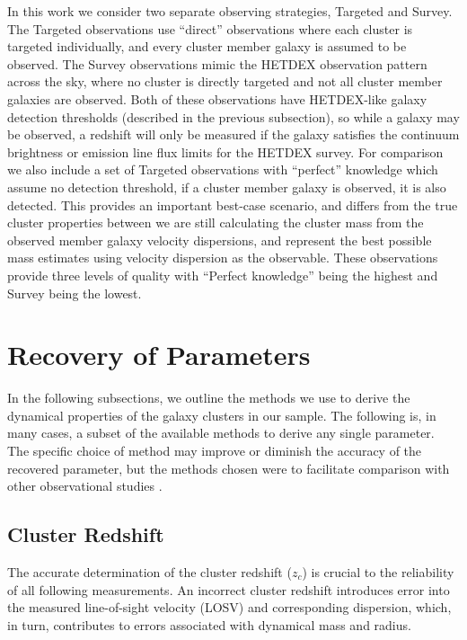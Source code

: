 In this work we consider two separate observing strategies, Targeted and Survey. The Targeted observations use ``direct'' observations where each cluster is targeted individually, and every cluster member galaxy is assumed to be observed. The Survey observations mimic the HETDEX observation pattern across the sky, where no cluster is directly targeted and not all cluster member galaxies are observed. Both of these observations have HETDEX-like galaxy detection thresholds (described in the previous subsection), so while a galaxy may be observed, a redshift will only be measured if the galaxy satisfies the continuum brightness or emission line flux limits for the HETDEX survey. For comparison we also include a set of Targeted observations with ``perfect'' knowledge which assume no detection threshold, if a cluster member galaxy is observed, it is also detected. This provides an important best-case scenario, and differs from the true cluster properties between we are still calculating the cluster mass from the observed member galaxy velocity dispersions, and represent the best possible mass estimates using velocity dispersion as the observable. These observations provide three levels of quality with ``Perfect knowledge'' being the highest and Survey being the lowest.

\section{Recovery of Parameters}\label{sec:recovery}
In the following subsections, we outline the methods we use to derive the dynamical properties of the galaxy clusters in our sample. The following is, in many cases, a subset of the available methods to derive any single parameter. The specific choice of method may improve or diminish the accuracy of the recovered parameter, but the methods chosen were to facilitate comparison with other observational studies . 

\subsection{Cluster Redshift}
The accurate determination of the cluster redshift ($z_c$) is crucial to the reliability of all following measurements. An incorrect cluster redshift introduces error into the measured line-of-sight velocity (LOSV) and corresponding dispersion, which, in turn, contributes to errors associated with dynamical mass and radius. 

